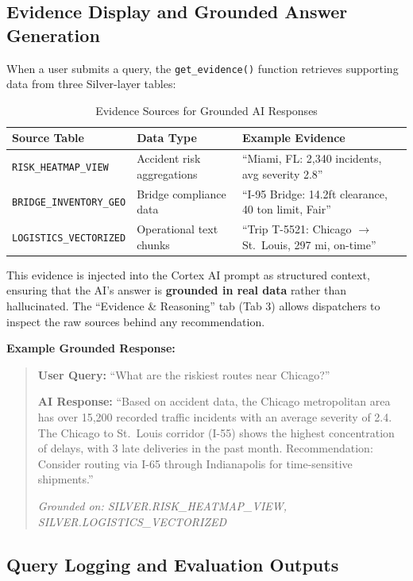 \documentclass[14.5pt,letterpaper]{article}
\begin{document}
\subsection{Evidence Display and Grounded Answer Generation}

When a user submits a query, the \texttt{get\_evidence()} function retrieves supporting data from three Silver-layer tables:

\begin{table}[H]
\centering
\caption{Evidence Sources for Grounded AI Responses}
\begin{tabularx}{\textwidth}{@{}l l X@{}}
\toprule
\textbf{Source Table} & \textbf{Data Type} & \textbf{Example Evidence} \\
\midrule
\texttt{RISK\_HEATMAP\_VIEW} & Accident risk aggregations & ``Miami, FL: 2,340 incidents, avg severity 2.8'' \\
\texttt{BRIDGE\_INVENTORY\_GEO} & Bridge compliance data & ``I-95 Bridge: 14.2ft clearance, 40 ton limit, Fair'' \\
\texttt{LOGISTICS\_VECTORIZED} & Operational text chunks & ``Trip T-5521: Chicago $\rightarrow$ St.\  Louis, 297 mi, on-time'' \\
\bottomrule
\end{tabularx}
\end{table}

This evidence is injected into the Cortex AI prompt as structured context, ensuring that the AI's answer is \textbf{grounded in real data} rather than hallucinated. The ``Evidence \& Reasoning'' tab (Tab 3) allows dispatchers to inspect the raw sources behind any recommendation.

\textbf{Example Grounded Response:}
\begin{quote}
\textbf{User Query:} ``What are the riskiest routes near Chicago?''

\textbf{AI Response:} ``Based on accident data, the Chicago metropolitan area has over 15,200 recorded traffic incidents with an average severity of 2.4. The Chicago to St.\ Louis corridor (I-55) shows the highest concentration of delays, with 3 late deliveries in the past month. Recommendation: Consider routing via I-65 through Indianapolis for time-sensitive shipments.''

\textit{Grounded on: SILVER.RISK\_HEATMAP\_VIEW, SILVER.LOGISTICS\_VECTORIZED}
\end{quote}

\subsection{Query Logging and Evaluation Outputs}
\end{document}
